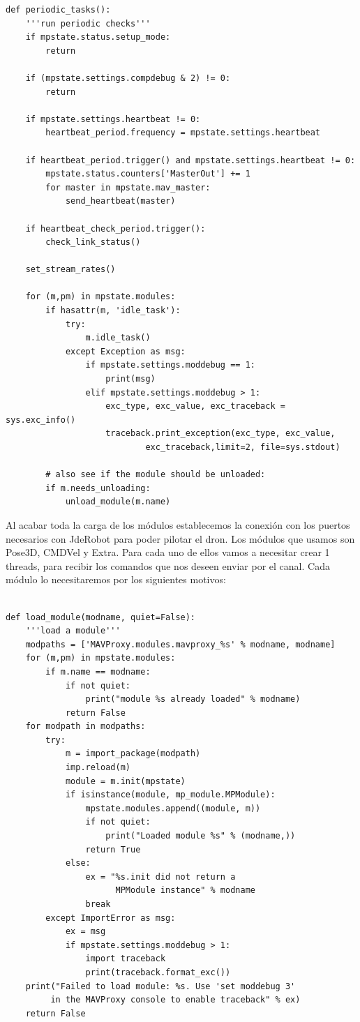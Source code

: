 \begin{lstlisting}[frame=single]
def periodic_tasks():
    '''run periodic checks'''
    if mpstate.status.setup_mode:
        return

    if (mpstate.settings.compdebug & 2) != 0:
        return

    if mpstate.settings.heartbeat != 0:
        heartbeat_period.frequency = mpstate.settings.heartbeat

    if heartbeat_period.trigger() and mpstate.settings.heartbeat != 0:
        mpstate.status.counters['MasterOut'] += 1
        for master in mpstate.mav_master:
            send_heartbeat(master)

    if heartbeat_check_period.trigger():
        check_link_status()

    set_stream_rates()

    for (m,pm) in mpstate.modules:
        if hasattr(m, 'idle_task'):
            try:
                m.idle_task()
            except Exception as msg:
                if mpstate.settings.moddebug == 1:
                    print(msg)
                elif mpstate.settings.moddebug > 1:
                    exc_type, exc_value, exc_traceback = sys.exc_info()
                    traceback.print_exception(exc_type, exc_value, 
                    		exc_traceback,limit=2, file=sys.stdout)

        # also see if the module should be unloaded:
        if m.needs_unloading:
            unload_module(m.name)
\end{lstlisting}
            
Al acabar toda la carga de los módulos establecemos la conexión con los puertos necesarios con JdeRobot para poder pilotar el dron. Los módulos que usamos son Pose3D, CMDVel y Extra. Para cada uno de ellos vamos a necesitar crear 1 threads, para recibir los comandos que nos deseen enviar por el canal. Cada módulo lo necesitaremos por los siguientes motivos:

\begin{lstlisting}[frame=single]

def load_module(modname, quiet=False):
    '''load a module'''
    modpaths = ['MAVProxy.modules.mavproxy_%s' % modname, modname]
    for (m,pm) in mpstate.modules:
        if m.name == modname:
            if not quiet:
                print("module %s already loaded" % modname)
            return False
    for modpath in modpaths:
        try:
            m = import_package(modpath)
            imp.reload(m)
            module = m.init(mpstate)
            if isinstance(module, mp_module.MPModule):
                mpstate.modules.append((module, m))
                if not quiet:
                    print("Loaded module %s" % (modname,))
                return True
            else:
                ex = "%s.init did not return a 
                      MPModule instance" % modname
                break
        except ImportError as msg:
            ex = msg
            if mpstate.settings.moddebug > 1:
                import traceback
                print(traceback.format_exc())
    print("Failed to load module: %s. Use 'set moddebug 3' 
         in the MAVProxy console to enable traceback" % ex)
    return False
\end{lstlisting}

